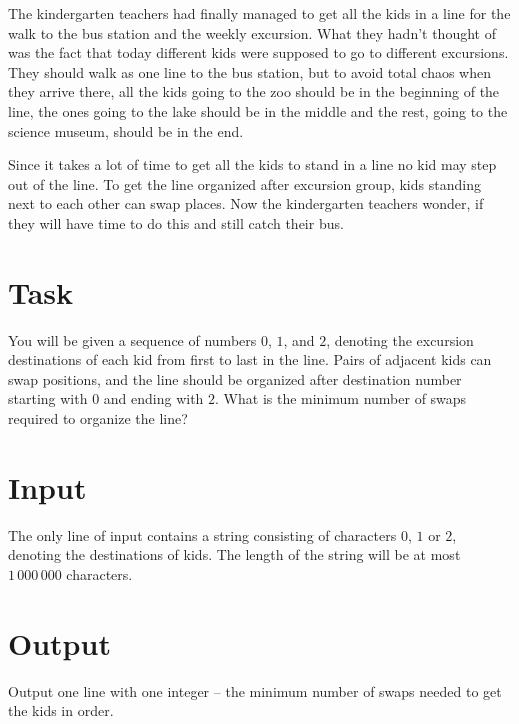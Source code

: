 The kindergarten teachers had finally managed to get all the kids in a line for the walk to the bus station and
the weekly excursion. What they hadn’t thought of was the fact that today different kids were supposed to go to
different excursions. They should walk as one line to the bus station, but to avoid total chaos when they arrive
there, all the kids going to the zoo should be in the beginning of the line, the ones going to the lake should be in
the middle and the rest, going to the science museum, should be in the end.

Since it takes a lot of time to get all the kids to stand in a line no kid may step out of the line. To get the line
organized after excursion group, kids standing next to each other can swap places. Now the kindergarten teachers
wonder, if they will have time to do this and still catch their bus.

\section*{Task}
You will be given a sequence of numbers $0$, $1$, and $2$, denoting the excursion destinations of each kid from first to last in the line.
Pairs of adjacent kids can swap positions, and the line should be organized after destination number starting with $0$ and ending with $2$.
What is the minimum number of swaps required to organize the line?

\section*{Input}
The only line of input contains a string consisting of characters $0$, $1$ or $2$, denoting the destinations of kids.
The length of the string will be at most $1\,000\,000$ characters.

\section*{Output}
Output one line with one integer -- the minimum number of swaps needed to get the kids in order.
